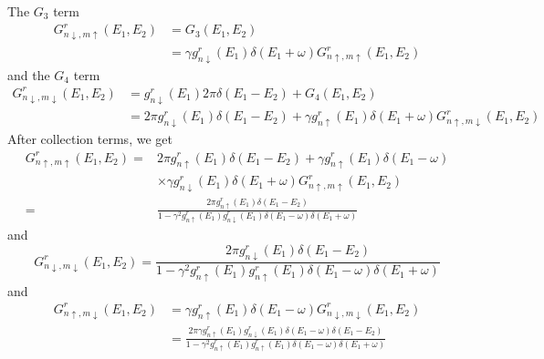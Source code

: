 \documentclass[11pt,a4paper]{article}
\begin{document}
The $G_{3}$ term
\begin{equation}
\begin{split}
G_{n \downarrow, m \uparrow}^{r}\left(E_{1}, E_{2}\right) &= G_{3}\left(E_{1}, E_{2}\right) \\
&= \gamma g_{n \downarrow}^{r} \left(E_{1}\right) \delta(E_{1}+\omega) G_{n \uparrow, m \uparrow}^{r}(E_{1},E_{2})
\end{split}
\end{equation}
and the $G_{4}$ term
\begin{equation}
\begin{split}
G_{n \downarrow, m \downarrow}^{r}\left(E_{1}, E_{2}\right) &= g_{n \downarrow}^{r}\left(E_{1}\right) 2 \pi \delta\left(E_{1}-E_{2}\right) +G_{4}\left(E_{1}, E_{2}\right)\\
&= 2 \pi g_{n \downarrow}^{r}\left(E_{1}\right) \delta\left(E_{1}-E_{2}\right) + \gamma g_{n \uparrow}^{r}(E_{1})\delta(E_{1}+\omega) G_{n \uparrow, m \downarrow}^{r}(E_{1}, E_{2})
\end{split}
\end{equation}
After collection terms, we get
\begin{equation}
\begin{split}
G_{n \uparrow, m \uparrow}^{r}(E_{1}, E_{2}) =& 2 \pi g_{n \uparrow}^{r}\left(E_{1}\right) \delta\left(E_{1}-E_{2}\right) + \gamma g_{n \uparrow}^{r}\left(E_{1}\right) \delta(E_{1}-\omega) \\
&\times\gamma g_{n \downarrow}^{r} \left(E_{1}\right) \delta(E_{1}+\omega) G_{n \uparrow, m \uparrow}^{r}(E_{1},E_{2}) \\
=& \frac{2 \pi g_{n \uparrow}^{r}\left(E_{1}\right) \delta\left(E_{1}-E_{2}\right)}{1-\gamma^{2} g_{n \uparrow}^{r}\left(E_{1}\right) g_{n \downarrow}^{r}\left(E_{1}\right) \delta(E_{1}-\omega)\delta(E_{1}+\omega)}
\end{split}
\end{equation}
and
\begin{equation}
G_{n \downarrow, m \downarrow}^{r}(E_{1}, E_{2}) = \frac{2 \pi g_{n \downarrow}^{r}\left(E_{1}\right) \delta\left(E_{1}-E_{2}\right)}{1-\gamma^{2} g_{n \uparrow}^{r}\left(E_{1}\right) g_{n \uparrow}^{r}\left(E_{1}\right) \delta(E_{1}-\omega)\delta(E_{1}+\omega)}
\end{equation}
and
\begin{equation}
\begin{split}
G_{n \uparrow, m \downarrow}^{r}\left(E_{1}, E_{2}\right) &=  \gamma g_{n \uparrow}^{r} \left(E_{1}\right) \delta(E_{1}-\omega) G_{n \downarrow, m \downarrow}^{r}(E_{1},E_{2}) \\
&=\frac{2 \pi \gamma g_{n \uparrow}^{r}\left(E_{1}\right) g_{n \downarrow}^{r}\left(E_{1}\right) \delta(E_{1}-\omega) \delta\left(E_{1}-E_{2}\right) }{1-\gamma^{2} g_{n \uparrow}^{r}\left(E_{1}\right) g_{n \uparrow}^{r}\left(E_{1}\right) \delta(E_{1}-\omega)\delta(E_{1}+\omega)}
\end{split}
\end{equation}
\end{document}
